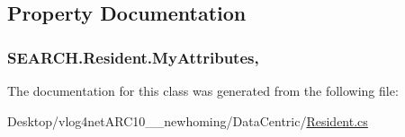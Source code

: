 \subsection{Property Documentation}
\hypertarget{class_s_e_a_r_c_h_1_1_resident_a9637f80aa1c0183823803a65d597d485}{
\subsubsection[{My\-Attributes}]{ S\-E\-A\-R\-C\-H.\-Resident.\-My\-Attributes\hspace{0.3cm}{\ttfamily [get]}, {\ttfamily [set]}}}\label{class_s_e_a_r_c_h_1_1_resident_a9637f80aa1c0183823803a65d597d485}


The documentation for this class was generated from the following file\-:\begin{DoxyCompactItemize}
\item 
Desktop/vlog4net\-A\-R\-C10\-\_\-\_\-newhoming/\-Data\-Centric/\hyperlink{_resident_8cs}{Resident.\-cs}\end{DoxyCompactItemize}
